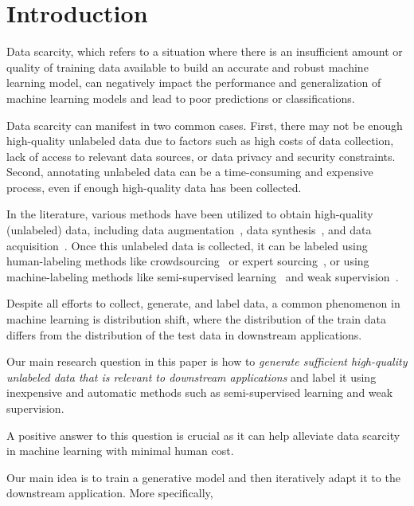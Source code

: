 \section{Introduction} 
\label{sec:intro}

Data scarcity, which refers to a situation where there is an insufficient amount or quality of training data available to build an accurate and robust machine learning model, can negatively impact the performance and generalization of machine learning models and lead to poor predictions or classifications.

Data scarcity can manifest in two common cases. First, there may not be enough high-quality unlabeled data due to factors such as high costs of data collection, lack of access to relevant data sources, or data privacy and security constraints. Second, annotating unlabeled data can be a time-consuming and expensive process, even if enough high-quality data has been collected.

In the literature, various methods have been utilized to obtain high-quality (unlabeled) data, including data augmentation~\cite{}, data synthesis~\cite{}, and data acquisition~\cite{}.
Once this unlabeled data is collected, it can be labeled using human-labeling methods like crowdsourcing~\cite{} or expert sourcing~\cite{}, or using machine-labeling methods like semi-supervised learning~\cite{} and weak supervision~\cite{}.

Despite all efforts to collect, generate, and label data, a common phenomenon in machine learning is distribution shift, where the distribution of the train data differs from the distribution of the test data in downstream applications.


Our main research question in this paper is how to \textit{generate sufficient high-quality unlabeled data that is relevant to downstream applications} and label it using inexpensive and automatic methods such as semi-supervised learning and weak supervision.

A positive answer to this question is crucial as it can help alleviate data scarcity in machine learning with minimal human cost.




Our main idea is to train a generative model and then iteratively adapt it to the downstream application.
More specifically, 

